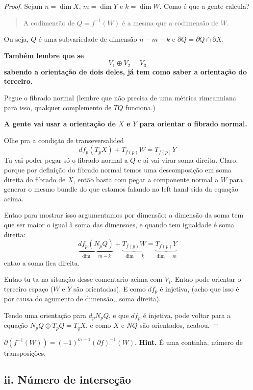 \begin{proof}\leavevmode
Sejam \(n = \dim X\), \(m = \dim Y\) e \(k = \dim W\). Como é que a gente calcula?
\begin{quotation}
	A codimensão de \(Q= f^{-1}(W)\) é a mesma que a codimensão de \(W\).
\end{quotation}
Ou seja, \(Q\) é uma subvariedade de dimensão \(n - m + k \) e  \(\partial  Q=\partial Q \cap \partial X\).

\textbf{Também lembre que se} 
\[V_1 \oplus  V_2= V_3\]
\textbf{sabendo a orientação de dois deles, já tem como saber a orientação do terceiro.} 

Pegue o fibrado normal (lembre que não precisa de uma métrica rimeanniana para isso, qualquer complemento de \(TQ\) funciona.)

\textbf{A gente vai usar a orientação de \(X\) e \(Y\) para orientar o fibrado normal.} 

Olhe pra a condição de transeversalided
\[ df_p(T_pX) + T_{f(p)}W = T_{f(p)}Y\]
Tu vai poder pegar só o fibrado normal a \(Q\) e ai vai virar soma direita. Claro, porque por definição do fibrado normal temos uma descomposição em soma direita do fibrado de \(X\), então basta com pegar a componente normal a \(W\) para generar o mesmo bundle do que estamos falando no left hand sida da equação acima.

Entao para mostrar isso argumentamos por dimensão: a dimensão da soma tem que ser maior o igual à soma das dimensoes, e quando tem igualdade é soma direita:
\[\underbrace{df_p(N_pQ)}_{\dim=m-k} + \underbrace{T_{f(p)}W}_{\dim=k}= \underbrace{T_{f(p)}Y}_{\dim= m}\]
entao a soma fica direita.

Entao tu ta na situação desse comentario acima com \(V_i\). Entao pode orientar o terceiro espaço (\(W\) e \(Y\) são orientadas). E como \(df_p\) é injetiva, (acho que isso é por causa do agumento de dimensão,, soma direita).

Tendo uma orientação para \(d_p N_pQ\), e que \(df_p\)  é injetiva, pode voltar para a equação \(N_pQ \oplus  T_pQ=T_qX\), e como \(X\) e \(NQ\)  são orientados, acabou.
\end{proof}


\begin{exercise}\leavevmode
\(\partial (f^{-1}(W)) = (-1)^{m-1}(\partial f)^{-1}(W)\). \textbf{Hint.} É uma continha, número de transposições.
\end{exercise}

\subsection{ii. Número de interseção}


